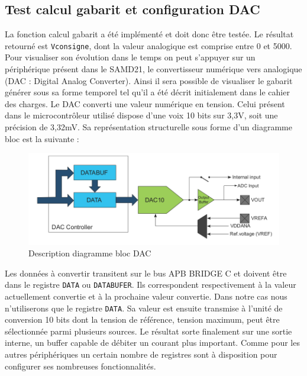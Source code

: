 \documentclass[a4paper]{article}
\begin{document}
	\subsection{Test calcul gabarit et configuration DAC}
	La fonction calcul gabarit a été implémenté et doit donc être testée. Le résultat retourné est \texttt{Vconsigne}, dont la valeur analogique est comprise entre 0 et 5000. Pour visualiser son évolution dans le temps on peut s'appuyer sur un périphérique présent dans le SAMD21, le convertisseur numérique vers analogique (DAC : Digital Analog Converter). Ainsi il sera possible de visualiser le gabarit générer sous sa forme temporel tel qu'il a été décrit initialement dans le cahier des charges. Le DAC converti une valeur numérique en tension. Celui présent dans le microcontrôleur utilisé dispose d'une voix 10 bits sur 3,3V, soit une précision de 3,32mV. Sa représentation structurelle sous forme d'un diagramme bloc est la suivante :
	\begin{figure}[H]
		\centering
		\includegraphics[width=0.75\linewidth]{DAC}
		\caption{Description diagramme bloc DAC}
	\end{figure}
	Les données à convertir transitent sur le bus APB BRIDGE C et doivent être dans le registre \texttt{DATA} ou \texttt{DATABUFER}. Ils correspondent respectivement à la valeur actuellement convertie et à la prochaine valeur convertie. Dans notre cas nous n'utiliserons que le registre \texttt{DATA}. Sa valeur est ensuite transmise à l'unité de conversion 10 bits dont la tension de référence, tension maximum, peut être sélectionnée parmi plusieurs sources. Le résultat sorte finalement sur une sortie interne, un buffer capable de débiter un courant plus important. Comme pour les autres périphériques un certain nombre de registres sont à disposition pour configurer ses nombreuses fonctionnalités.
	
\end{document}
